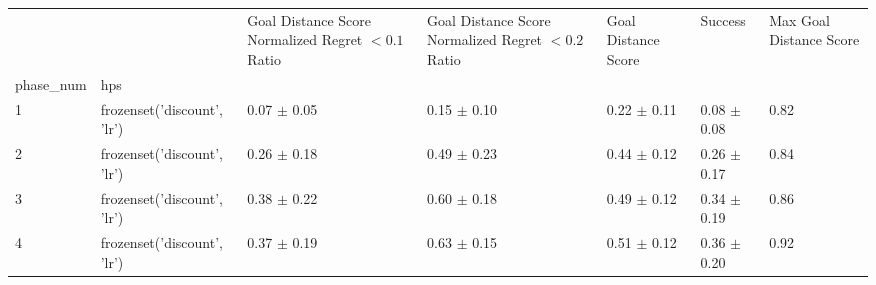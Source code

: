 \begin{tabular}{lllllll}
\toprule
 &  & Goal Distance Score Normalized Regret $< 0.1$ Ratio & Goal Distance Score Normalized Regret $< 0.2$ Ratio & Goal Distance Score & Success & Max Goal Distance Score \\
phase_num & hps &  &  &  &  &  \\
\midrule
1 & frozenset({'discount', 'lr'}) & 0.07 $\pm$ 0.05 & 0.15 $\pm$ 0.10 & 0.22 $\pm$ 0.11 & 0.08 $\pm$ 0.08 & 0.82 \\
\cline{1-7}
2 & frozenset({'discount', 'lr'}) & 0.26 $\pm$ 0.18 & 0.49 $\pm$ 0.23 & 0.44 $\pm$ 0.12 & 0.26 $\pm$ 0.17 & 0.84 \\
\cline{1-7}
3 & frozenset({'discount', 'lr'}) & 0.38 $\pm$ 0.22 & 0.60 $\pm$ 0.18 & 0.49 $\pm$ 0.12 & 0.34 $\pm$ 0.19 & 0.86 \\
\cline{1-7}
4 & frozenset({'discount', 'lr'}) & 0.37 $\pm$ 0.19 & 0.63 $\pm$ 0.15 & 0.51 $\pm$ 0.12 & 0.36 $\pm$ 0.20 & 0.92 \\
\cline{1-7}
\bottomrule
\end{tabular}
